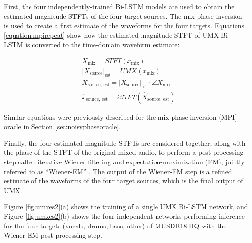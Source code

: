 \documentclass[report.tex]{subfiles}
\begin{document}
First, the four independently-trained Bi-LSTM models are used to obtain the estimated magnitude STFTs of the four target sources. The mix phase inversion is used to create a first estimate of the waveforms for the four targets. Equations \eqref{equation:mpirepeat} show how the estimated magnitude STFT of UMX Bi-LSTM is converted to the time-domain waveform estimate:

\begin{align}\tag{30}\label{equation:mpirepeat}
	\nonumber & X_{\text{mix}} = \mathit{STFT}(x_{\text{mix}})\\
	\nonumber & {|X_{\text{source}}|}_{\text{est}} = \mathit{UMX}(x_{\text{mix}})\\
	\nonumber & X_{\text{source, est}} = {|X_{\text{source}}|}_{\text{est}} \cdot \angle{X_{\text{mix}}}\\
	\nonumber & \hat{x}_{\text{source, est}} = \mathit{iSTFT}(\hat{X}_{\text{source, est}})
\end{align}

Similar equations were previously described for the mix-phase inversion (MPI) oracle in Section \ref{sec:noisyphaseoracle}.

Finally, the four estimated magnitude STFTs are considered together, along with the phase of the STFT of the original mixed audio, to perform a post-processing step called iterative Wiener filtering and expectation-maximization (EM), jointly referred to as ``Wiener-EM'' \parencite{umxorig1, wiener2, wiener3, wiener4}. The output of the Wiener-EM step is a refined estimate of the waveforms of the four target sources, which is the final output of UMX.

Figure \ref{fig:umxes2}(a) shows the training of a single UMX Bi-LSTM network, and Figure \ref{fig:umxes2}(b) shows the four independent networks performing inference for the four targets (vocals, drums, bass, other) of MUSDB18-HQ with the Wiener-EM post-processing step.
\end{document}

